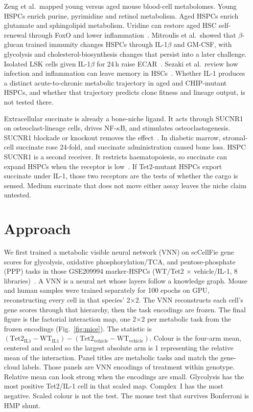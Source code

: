 \documentclass[11pt]{article}
\begin{document}
Zeng et al.\ mapped young versus aged mouse blood-cell metabolomes. Young HSPCs enrich
purine, pyrimidine and retinol metabolism. Aged HSPCs enrich glutamate and
sphingolipid metabolism. Uridine can restore aged HSC self-renewal through FoxO and
lower inflammation~\cite{Zeng2024UridineHSC}. Mitroulis et al.\ showed that
$\beta$-glucan trained immunity changes HSPCs through IL-1$\beta$ and GM-CSF, with
glycolysis and cholesterol-biosynthesis changes that persist into a later challenge.
Isolated LSK cells given IL-1$\beta$ for 24\,h raise
ECAR~\cite{Mitroulis2018TrainedImmunity}. Sezaki et al.\ review how infection and
inflammation can leave memory in HSCs~\cite{Sezaki2020HSPCinflammation}. Whether IL-1
produces a distinct acute-to-chronic metabolic trajectory in aged and CHIP-mutant
HSPCs, and whether that trajectory predicts clone fitness and lineage output, is not
tested there.

Extracellular succinate is already a bone-niche ligand. It acts through SUCNR1 on
osteoclast-lineage cells, drives NF-$\kappa$B, and stimulates osteoclastogenesis. SUCNR1
blockade or knockout removes the
effect~\cite{Guo2017Succinate}. In diabetic marrow, stromal-cell succinate rose
24-fold, and succinate administration caused bone loss. HSPC SUCNR1 is a second
receiver. It restricts haematopoiesis, so succinate can expand HSPCs when the receptor
is low~\cite{Cuminetti2026SUCNR1}. If Tet2-mutant HSPCs export succinate under IL-1,
those two receptors are the tests of whether the cargo is sensed. Medium succinate that
does not move either assay leaves the niche claim untested.

\section*{Approach}

We first trained a metabolic visible neural network (VNN) on scCellFie gene scores for
glycolysis, oxidative phosphorylation/TCA, and pentose-phosphate (PPP) tasks in those
GSE209994 marker-HSPCs (WT/Tet2 $\times$ vehicle/IL-1, 8
libraries)~\cite{McClatchy2023TET2IL1,Armingol2025scCellFie}. A VNN is a neural net
whose layers follow a knowledge graph. Mouse and human samples were trained separately for 100 epochs on GPU, reconstructing every cell
in that species' 2$\times$2. The VNN reconstructs each cell's gene scores through
that hierarchy, then the task encodings are frozen. The final figure is the factorial
interaction map, one 2$\times$2 per metabolic task from the frozen encodings
(Fig.~\ref{fig:mice}). The statistic is
$(\mathrm{Tet2_{IL1}}-\mathrm{WT_{IL1}})-(\mathrm{Tet2_{vehicle}}-\mathrm{WT_{vehicle}})$.
Colour is the four-arm mean, centered and scaled so the largest absolute arm is 1
representing the relative mean of the interaction. Panel titles are metabolic tasks and
match the gene-cloud labels. Those panels are VNN encodings of treatment within
genotype. Relative mean can look strong when the encodings are small. Glycolysis has
the most positive Tet2/IL-1 cell in that scaled map. Complex~I has the most negative.
Scaled colour is not the test. The mouse test that survives Bonferroni is HMP shunt.
\end{document}
